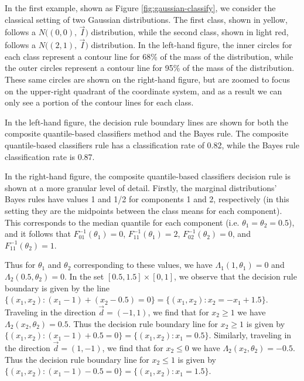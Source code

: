 In the first example, shown as Figure \ref{fig:gaussian-classify}, we consider
the classical setting of two Gaussian distributions.  The first class, shown in
yellow, follows a $N \big( (0, 0),\, \vec{I} \big)$ distribution, while the
second class, shown in light red, follows a $N \big( (2, 1),\, \vec{I} \big)$
distribution.  In the left-hand figure, the inner circles for each class
represent a contour line for 68\% of the mass of the distribution, while the
outer circles represent a contour line for 95\% of the mass of the distribution.
These same circles are shown on the right-hand figure, but are zoomed to focus
on the upper-right quadrant of the coordinate system, and as a result we can
only see a portion of the contour lines for each class.

In the left-hand figure, the decision rule boundary lines are shown for both the
composite quantile-based classifiers method and the Bayes rule.  The composite
quantile-based classifiers rule has a classification rate of 0.82, while the
Bayes rule classification rate is 0.87.

In the right-hand figure, the composite quantile-based classifiers decision rule
is shown at a more granular level of detail.  Firstly, the marginal
distributions' Bayes rules have values 1 and 1/2 for components 1 and 2,
respectively (in this setting they are the midpoints between the class means for
each component).  This corresponds to the median quantile for each component
(i.e. $\theta_1 = \theta_2 = 0.5$), and it follows that
$F_{01}^{-1}(\theta_1) = 0$, $F_{11}^{-1}(\theta_1) = 2$,
$F_{02}^{-1}(\theta_2) = 0$, and $F_{11}^{-1}(\theta_2) = 1$.

Thus for $\theta_1$ and $\theta_2$ corresponding to these values, we have
$\Lambda_1(1, \theta_1) = 0$ and $\Lambda_2(0.5, \theta_2) = 0$.  In the set
$[0.5, 1.5] \times [0, 1]$, we observe that the decision rule boundary is given
by the line
$\{(x_1, x_2) : (x_1 - 1) + (x_2 - 0.5) = 0 \} = \{(x_1, x_2) : x_2 = -x_1 +
1.5\}$.  Traveling in the direction $\vec{d} = (-1, 1)$, we find that for
$x_2 \geq 1$ we have $\Lambda_2(x_2, \theta_2) = 0.5$.  Thus the decision rule
boundary line for $x_2 \geq 1$ is given by
$\{(x_1, x_2) : (x_1 - 1) + 0.5 = 0\} = \{(x_1, x_2) : x_1 = 0.5\} $.
Similarly, traveling in the direction $\vec{d} = (1, -1)$, we find that for
$x_2 \leq 0$ we have $\Lambda_2(x_2, \theta_2) = -0.5$.  Thus the decision rule
boundary line for $x_2 \leq 1$ is given by
$\{(x_1, x_2) : (x_1 - 1) - 0.5 = 0\} = \{(x_1, x_2) : x_1 = 1.5\}$.

